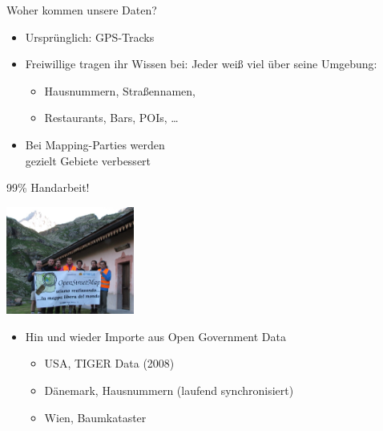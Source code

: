 \documentclass{beamer}
\begin{document}
\begin{frame}{Woher kommen unsere Daten?}

\begin{itemize}
  \item Ursprünglich: GPS-Tracks
  \item Freiwillige tragen ihr Wissen bei: Jeder weiß viel über seine Umgebung:
        \begin{itemize}
          \item Hausnummern, Straßennamen,
          \item Restaurants, Bars, POIs, \dots
  \end{itemize}
  \pause
  \item Bei Mapping-Parties werden \\ gezielt Gebiete verbessert
\end{itemize}

  \vspace{0.4cm}
 99\% Handarbeit!

  \vspace*{-2.9cm}
 \hfill \includegraphics[width=4.2cm]{alps_mp.jpg}


  \pause
\begin{itemize}
  \item Hin und wieder Importe aus Open Government Data
  \begin{itemize}
    \item USA, TIGER Data (2008)
    \item Dänemark, Hausnummern (laufend synchronisiert)
    \item Wien, Baumkataster
  \end{itemize}
\end{itemize}

\end{frame}
\end{document}
